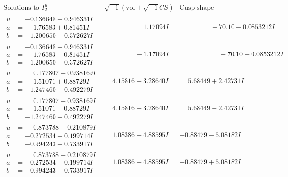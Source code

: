 \documentclass[1p]{elsarticle_modified}
\theoremstyle{definition}
\newcommand{\I}{\sqrt{-1}}
\begin{document}
$$\begin{array}{c|c|c}  
\text{Solutions to }I^u_{2}& \I (\text{vol} + \sqrt{-1}CS) & \text{Cusp shape}\\
 \hline 
\begin{aligned}
u &= -0.136648 + 0.946331 I \\
a &= \phantom{-}1.76583 + 0.81451 I \\
b &= -1.200650 + 0.372627 I\end{aligned}
 & \phantom{-0.000000 -}1.17094 I & \phantom{-0.000000 }      -7
0. 10   - 0.0853212 I \\ \hline\begin{aligned}
u &= -0.136648 - 0.946331 I \\
a &= \phantom{-}1.76583 - 0.81451 I \\
b &= -1.200650 - 0.372627 I\end{aligned}
 & \phantom{-0.000000 } -1.17094 I & \phantom{-0.000000 -}     -7
0. 10   + 0.0853212 I \\ \hline\begin{aligned}
u &= \phantom{-}0.177807 + 0.938169 I \\
a &= \phantom{-}1.51071 + 0.88729 I \\
b &= -1.247460 + 0.492279 I\end{aligned}
 & \phantom{-}4.15816 - 3.28640 I & \phantom{-}5.68449 + 2.42731 I \\ \hline\begin{aligned}
u &= \phantom{-}0.177807 - 0.938169 I \\
a &= \phantom{-}1.51071 - 0.88729 I \\
b &= -1.247460 - 0.492279 I\end{aligned}
 & \phantom{-}4.15816 + 3.28640 I & \phantom{-}5.68449 - 2.42731 I \\ \hline\begin{aligned}
u &= \phantom{-}0.873788 + 0.210879 I \\
a &= -0.272534 + 0.199714 I \\
b &= -0.994243 - 0.733917 I\end{aligned}
 & \phantom{-}1.08386 + 4.88595 I & -0.88479 - 6.08182 I \\ \hline\begin{aligned}
u &= \phantom{-}0.873788 - 0.210879 I \\
a &= -0.272534 - 0.199714 I \\
b &= -0.994243 + 0.733917 I\end{aligned}
 & \phantom{-}1.08386 - 4.88595 I & -0.88479 + 6.08182 I \\ \hline\begin{aligned}

\end{aligned}
\end{array}$$
\end{document}
